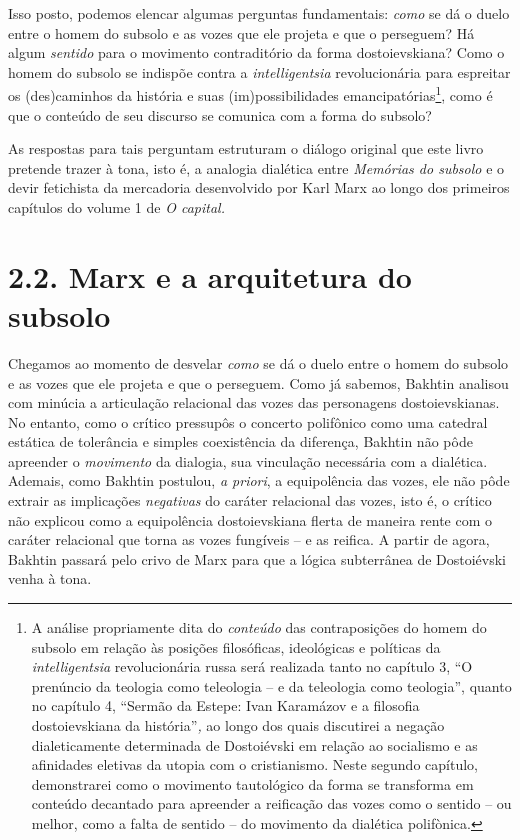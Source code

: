 Isso posto, podemos elencar algumas perguntas fundamentais: \emph{como}
se dá o duelo entre o homem do subsolo e as vozes que ele projeta e que
o perseguem? Há algum \emph{sentido} para o movimento contraditório da
forma dostoievskiana? Como o homem do subsolo se indispõe contra a
\emph{intelligentsia} revolucionária para espreitar os (des)caminhos da
história e suas (im)possibilidades emancipatórias\footnote{A análise
  propriamente dita do \emph{conteúdo} das contraposições do homem do
  subsolo em relação às posições filosóficas, ideológicas e políticas da
  \emph{intelligentsia} revolucionária russa será realizada tanto no
  capítulo 3, ``O prenúncio da teologia como teleologia -- e da
  teleologia como teologia'', quanto no capítulo 4, ``Sermão da Estepe:
  Ivan Karamázov e a filosofia dostoievskiana da história''\emph{,} ao
  longo dos quais discutirei a negação dialeticamente determinada de
  Dostoiévski em relação ao socialismo e as afinidades eletivas da
  utopia com o cristianismo. Neste segundo capítulo, demonstrarei como o
  movimento tautológico da forma se transforma em conteúdo decantado
  para apreender a reificação das vozes como o sentido -- ou melhor,
  como a falta de sentido -- do movimento da dialética polifònica.},
como é que o conteúdo de seu discurso se comunica com a forma do
subsolo?

As respostas para tais perguntam estruturam o diálogo original que este
livro pretende trazer à tona, isto é, a analogia dialética entre
\emph{Memórias do subsolo} e o devir fetichista da mercadoria
desenvolvido por Karl Marx ao longo dos primeiros capítulos do volume 1
de \emph{O capital. }

\section{2.2. Marx e a arquitetura do subsolo}

Chegamos ao momento de desvelar \emph{como} se dá o duelo entre o homem
do subsolo e as vozes que ele projeta e que o perseguem. Como já
sabemos, Bakhtin analisou com minúcia a articulação relacional das vozes
das personagens dostoievskianas. No entanto, como o crítico pressupôs o
concerto polifônico como uma catedral estática de tolerância e simples
coexistência da diferença, Bakhtin não pôde apreender o \emph{movimento}
da dialogia, sua vinculação necessária com a dialética. Ademais, como
Bakhtin postulou, \emph{a priori}, a equipolência das vozes, ele não
pôde extrair as implicações \emph{negativas} do caráter relacional das
vozes, isto é, o crítico não explicou como a equipolência dostoievskiana
flerta de maneira rente com o caráter relacional que torna as vozes
fungíveis -- e as reifica. A partir de agora, Bakhtin passará pelo crivo
de Marx para que a lógica subterrânea de Dostoiévski venha à tona.

